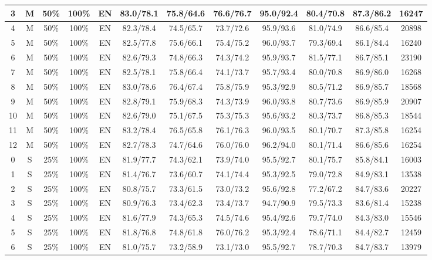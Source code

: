 \begin{table*}
{\begin{tabular}{|c|c|c|c|c||c|c|c|c|c|c||c|}
3 & M & 50\% & 100\% & EN & 83.0/78.1 & 75.8/64.6 & 76.6/76.7 & 95.0/92.4 & 80.4/70.8 & 87.3/86.2 & 16247 \\ \hline
4 & M & 50\% & 100\% & EN & 82.3/78.4 & 74.5/65.7 & 73.7/72.6 & 95.9/93.6 & 81.0/74.9 & 86.6/85.4 & 20898 \\ \hline
5 & M & 50\% & 100\% & EN & 82.5/77.8 & 75.6/66.1 & 75.4/75.2 & 96.0/93.7 & 79.3/69.4 & 86.1/84.4 & 16240 \\ \hline
6 & M & 50\% & 100\% & EN & 82.6/79.3 & 74.8/66.3 & 74.3/74.2 & 95.9/93.7 & 81.5/77.1 & 86.7/85.1 & 23190 \\ \hline
7 & M & 50\% & 100\% & EN & 82.5/78.1 & 75.8/66.4 & 74.1/73.7 & 95.7/93.4 & 80.0/70.8 & 86.9/86.0 & 16268 \\ \hline
8 & M & 50\% & 100\% & EN & 83.0/78.6 & 76.4/67.4 & 75.8/75.9 & 95.3/92.9 & 80.5/71.2 & 86.9/85.7 & 18568 \\ \hline
9 & M & 50\% & 100\% & EN & 82.8/79.1 & 75.9/68.3 & 74.3/73.9 & 96.0/93.8 & 80.7/73.6 & 86.9/85.9 & 20907 \\ \hline
10 & M & 50\% & 100\% & EN & 82.6/79.0 & 75.1/67.5 & 75.3/75.3 & 95.6/93.2 & 80.3/73.7 & 86.8/85.3 & 18544 \\ \hline
11 & M & 50\% & 100\% & EN & 83.2/78.4 & 76.5/65.8 & 76.1/76.3 & 96.0/93.5 & 80.1/70.7 & 87.3/85.8 & 16254 \\ \hline
12 & M & 50\% & 100\% & EN & 82.7/78.3 & 74.7/64.6 & 76.0/76.0 & 96.2/94.0 & 80.1/71.4 & 86.6/85.6 & 16254 \\ \hline
0 & S & 25\% & 100\% & EN & 81.9/77.7 & 74.3/62.1 & 73.9/74.0 & 95.5/92.7 & 80.1/75.7 & 85.8/84.1 & 16003 \\ \hline
1 & S & 25\% & 100\% & EN & 81.4/76.7 & 73.6/60.7 & 74.1/74.4 & 95.3/92.5 & 79.0/72.8 & 84.9/83.1 & 13538 \\ \hline
2 & S & 25\% & 100\% & EN & 80.8/75.7 & 73.3/61.5 & 73.0/73.2 & 95.6/92.8 & 77.2/67.2 & 84.7/83.6 & 20227 \\ \hline
3 & S & 25\% & 100\% & EN & 80.9/76.3 & 73.4/62.3 & 73.4/73.7 & 94.7/90.9 & 79.5/73.3 & 83.6/81.4 & 15238 \\ \hline
4 & S & 25\% & 100\% & EN & 81.6/77.9 & 74.3/65.3 & 74.5/74.6 & 95.4/92.6 & 79.7/74.0 & 84.3/83.0 & 15546 \\ \hline
5 & S & 25\% & 100\% & EN & 81.8/76.8 & 74.8/61.8 & 76.0/76.2 & 95.3/92.4 & 78.6/71.1 & 84.4/82.7 & 12459 \\ \hline
6 & S & 25\% & 100\% & EN & 81.0/75.7 & 73.2/58.9 & 73.1/73.0 & 95.5/92.7 & 78.7/70.3 & 84.7/83.7 & 13979 \\ \hline

\end{tabular}}
\end{table*}

